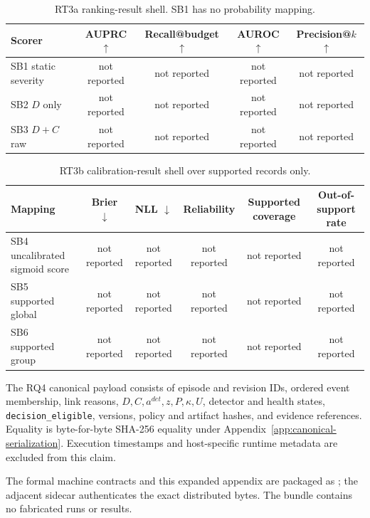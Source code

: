 \begin{table}[t]
\caption{RT3a ranking-result shell. SB1 has no probability mapping.}
\label{tab:ranking-results}
\centering
\small
\begin{tabular}{lcccc}
\toprule
\textbf{Scorer} & \textbf{AUPRC} $\uparrow$ & \textbf{Recall@budget} $\uparrow$ & \textbf{AUROC} $\uparrow$ & \textbf{Precision@$k$} $\uparrow$ \\
\midrule
SB1 static severity & not reported & not reported & not reported & not reported \\
SB2 $D$ only & not reported & not reported & not reported & not reported \\
SB3 $D+C$ raw & not reported & not reported & not reported & not reported \\
\bottomrule
\end{tabular}
\end{table}

\begin{table}[t]
\caption{RT3b calibration-result shell over supported records only.}
\label{tab:calibration-results}
\centering
\small
\begin{tabular}{lccccc}
\toprule
\textbf{Mapping} & \textbf{Brier} $\downarrow$ & \textbf{NLL} $\downarrow$ & \textbf{Reliability} & \textbf{Supported coverage} & \textbf{Out-of-support rate} \\
\midrule
SB4 uncalibrated sigmoid score & not reported & not reported & not reported & not reported & not reported \\
SB5 supported global & not reported & not reported & not reported & not reported & not reported \\
SB6 supported group & not reported & not reported & not reported & not reported & not reported \\
\bottomrule
\end{tabular}
\end{table}

The RQ4 canonical payload consists of episode and revision IDs, ordered event membership,
link reasons, $D,C,a^{det},z,P,\kappa,U$, detector and health states,
\texttt{decision\_eligible}, versions, policy and artifact hashes, and evidence references.
Equality is byte-for-byte SHA-256 equality under
Appendix~\ref{app:canonical-serialization}. Execution timestamps and host-specific runtime
metadata are excluded from this claim.

The formal machine contracts and this expanded appendix are packaged as
; the adjacent  sidecar
authenticates the exact distributed bytes. The bundle contains no fabricated runs or results.
